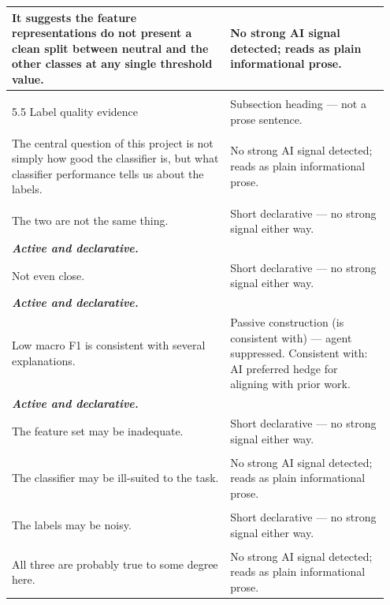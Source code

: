 \documentclass[11pt]{article}
\begin{document}
\begin{longtable}{|p{0.55\linewidth}|p{0.40\linewidth}|}
\hline
It suggests the feature representations do not present a clean split between neutral and the other classes at any single threshold value. & No strong AI signal detected; reads as plain informational prose. \\[2pt]
\hline
\rule{0pt}{3.5cm} & \\
\hline
5.5 Label quality evidence & Subsection heading --- not a prose sentence. \\[2pt]
\hline
\rule{0pt}{3.5cm} & \\
\hline
The central question of this project is not simply how good the classifier is, but what classifier performance tells us about the labels. & No strong AI signal detected; reads as plain informational prose. \\[2pt]
\hline
\rule{0pt}{3.5cm} & \\
\hline
The two are not the same thing. & Short declarative --- no strong signal either way. \\[2pt]
\hline
\textbf{\textit{Active and declarative.}}\vspace{2em} & \\
\hline
Not even close. & Short declarative --- no strong signal either way. \\[2pt]
\hline
\textbf{\textit{Active and declarative.}}\vspace{2em} & \\
\hline
Low macro F1 is consistent with several explanations. & Passive construction (is consistent with) --- agent suppressed. Consistent with: AI preferred hedge for aligning with prior work. \\[2pt]
\hline
\textbf{\textit{Active and declarative.}}\vspace{2em} & \\
\hline
The feature set may be inadequate. & Short declarative --- no strong signal either way. \\[2pt]
\hline
\rule{0pt}{3.5cm} & \\
\hline
The classifier may be ill-suited to the task. & No strong AI signal detected; reads as plain informational prose. \\[2pt]
\hline
\rule{0pt}{3.5cm} & \\
\hline
The labels may be noisy. & Short declarative --- no strong signal either way. \\[2pt]
\hline
\rule{0pt}{3.5cm} & \\
\hline
All three are probably true to some degree here. & No strong AI signal detected; reads as plain informational prose. \\[2pt]

\end{longtable}
\end{document}
